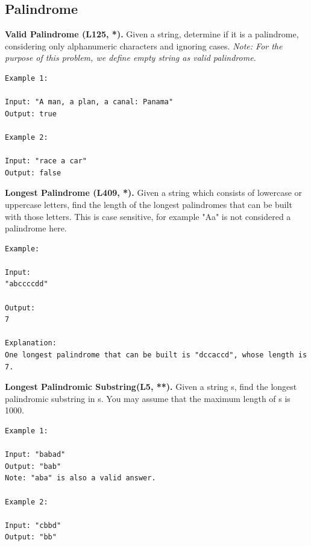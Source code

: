 \documentclass[../main.tex]{subfiles}
\begin{document}
\subsection{Palindrome}
\begin{Exercise}\label{Palindrome} %
        \vspace{-\baselineskip}%
        \Question\label{valid_pa}\textbf{Valid Palindrome (L125, *).} Given a string, determine if it is a palindrome, considering only alphanumeric characters and ignoring cases. \textit{Note: For the purpose of this problem, we define empty string as valid palindrome.}
        \begin{lstlisting}[numbers=none]
        Example 1:

Input: "A man, a plan, a canal: Panama"
Output: true

Example 2:

Input: "race a car"
Output: false
        \end{lstlisting}
\Question \textbf{Longest Palindrome (L409, *).} Given a string which consists of lowercase or uppercase letters, find the length of the longest palindromes that can be built with those letters. This is case sensitive, for example "Aa" is not considered a palindrome here.
\begin{lstlisting}[numbers=none]
Example:

Input:
"abccccdd"

Output:
7

Explanation:
One longest palindrome that can be built is "dccaccd", whose length is 7.
\end{lstlisting}

        \Question\label{Palindrome_1}\textbf{Longest Palindromic Substring(L5, **).} Given a string s, find the longest palindromic substring in s. You may assume that the maximum length of s is 1000.
\begin{lstlisting}[numbers=none]
Example 1:

Input: "babad"
Output: "bab"
Note: "aba" is also a valid answer.

Example 2:

Input: "cbbd"
Output: "bb"
\end{lstlisting}
\end{Exercise}
\end{document}
